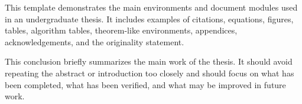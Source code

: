 \documentclass{hitbook-en}
\begin{document}
\makeatletter\@mainmattertrue\makeatother
{}
\makeenglishcover
\setcounter{page}{2}

\begin{abstractpage}
This template demonstrates the main environments and document modules used in an undergraduate thesis. It includes examples of citations, equations, figures, tables, algorithm tables, theorem-like environments, appendices, acknowledgements, and the originality statement.

\end{abstractpage}

\cleardoublepage
\tableofcontents
\cleardoublepage




\backmatter
\begin{conclusions}
This conclusion briefly summarizes the main work of the thesis. It should avoid repeating the abstract or introduction too closely and should focus on what has been completed, what has been verified, and what may be improved in future work.
\end{conclusions}


\cleardoublepage
{}
{}


\appendix

\authorization

\end{document}
